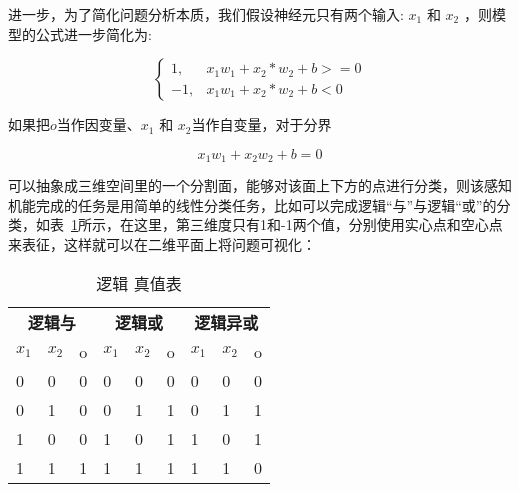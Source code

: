 进一步，为了简化问题分析本质，我们假设神经元只有两个输入: $x_1$ 和 $x_2$ ，则模型的公式进一步简化为:

\begin{equation}
    \begin{cases} 
        1, & x_1w_1+x_2 * w_2+b>=0 \\
        -1, & x_1w_1+x_2*w_2+b<0 
    \end{cases}
\end{equation}

如果把$o$当作因变量、$x_1$ 和 $x_2$当作自变量，对于分界

\begin{equation}
    x_1w_1+x_2w_2+b=0
\end{equation}

可以抽象成三维空间里的一个分割面，能够对该面上下方的点进行分类，则该感知机能完成的任务是用简单的线性分类任务，比如可以完成逻辑“与”与逻辑“或”的分类，如表~\ref{tab:logic}所示，在这里，第三维度只有1和-1两个值，分别使用实心点和空心点来表征，这样就可以在二维平面上将问题可视化：

\begin{table}[!htbp]
    \caption{逻辑 真值表}
    \label{tab:logic}
    \centering
    \footnotesize%
    \setlength{\tabcolsep}{4pt}%
    \renewcommand{\arraystretch}{1.2}%
    \begin{tabular}{lllllllll}
    \toprule
    \multicolumn{3}{c}{\textbf{逻辑与}}  & \multicolumn{3}{c}{\textbf{逻辑或}} & \multicolumn{3}{c}{\textbf{逻辑异或}}       \\
    $x_1$ & $x_2$ & o & $x_1$ & $x_2$ & o & $x_1$ & $x_2$ & o   \\
    \midrule
    0              & 0              & 0              & 0              & 0              & 0              & 0              & 0              & 0              \\
    0              & 1              & 0              & 0              & 1              & 1              & 0              & 1              & 1              \\
    1              & 0              & 0              & 1              & 0              & 1              & 1              & 0              & 1              \\
    1              & 1              & 1              & 1              & 1              & 1              & 1              & 1              & 0              \\
    \bottomrule
    \end{tabular}
\end{table}

